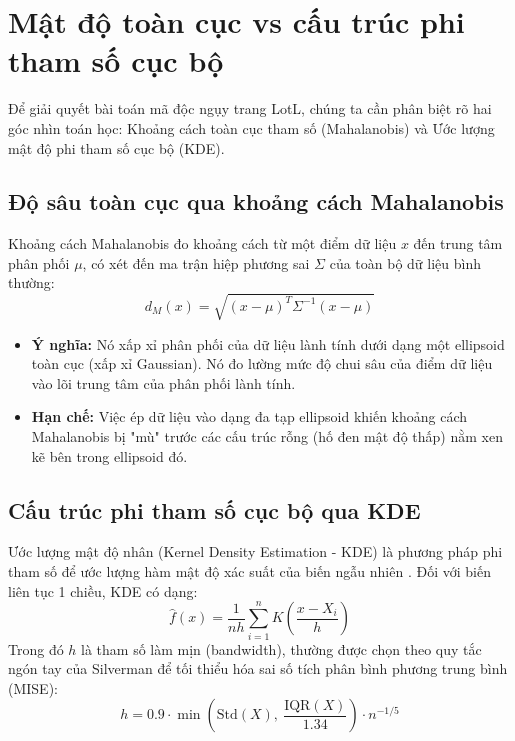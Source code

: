﻿\documentclass[../main.tex]{subfiles}
\begin{document}
\section{Mật độ toàn cục vs cấu trúc phi tham số cục bộ}
\label{section:1.6}

Để giải quyết bài toán mã độc ngụy trang LotL, chúng ta cần phân biệt rõ hai góc nhìn toán học: Khoảng cách toàn cục tham số (Mahalanobis) và Ước lượng mật độ phi tham số cục bộ (KDE).

\subsection{Độ sâu toàn cục qua khoảng cách Mahalanobis}
Khoảng cách Mahalanobis đo khoảng cách từ một điểm dữ liệu $x$ đến trung tâm phân phối $\mu$, có xét đến ma trận hiệp phương sai $\Sigma$ của toàn bộ dữ liệu bình thường:
\begin{equation}
    d_M(x) = \sqrt{(x - \mu)^T \Sigma^{-1} (x - \mu)}
\end{equation}
\begin{itemize}
    \item \textbf{Ý nghĩa:} Nó xấp xỉ phân phối của dữ liệu lành tính dưới dạng một ellipsoid toàn cục (xấp xỉ Gaussian). Nó đo lường mức độ chui sâu của điểm dữ liệu vào lõi trung tâm của phân phối lành tính.
    \item \textbf{Hạn chế:} Việc ép dữ liệu vào dạng đa tạp ellipsoid khiến khoảng cách Mahalanobis bị "mù" trước các cấu trúc rỗng (hố đen mật độ thấp) nằm xen kẽ bên trong ellipsoid đó.
\end{itemize}

\subsection{Cấu trúc phi tham số cục bộ qua KDE}
Ước lượng mật độ nhân (Kernel Density Estimation - KDE) là phương pháp phi tham số để ước lượng hàm mật độ xác suất của biến ngẫu nhiên \cite{silverman1986density}. Đối với biến liên tục 1 chiều, KDE có dạng:
\begin{equation}
    \hat{f}(x) = \frac{1}{nh} \sum_{i=1}^{n} K\left( \frac{x - X_i}{h} \right)
\end{equation}
Trong đó $h$ là tham số làm mịn (bandwidth), thường được chọn theo quy tắc ngón tay của Silverman để tối thiểu hóa sai số tích phân bình phương trung bình (MISE):
\begin{equation}
    h = 0.9 \cdot \min\left( \text{Std}(X),\ \frac{\text{IQR}(X)}{1.34} \right) \cdot n^{-1/5}
\end{equation}
\end{document}
